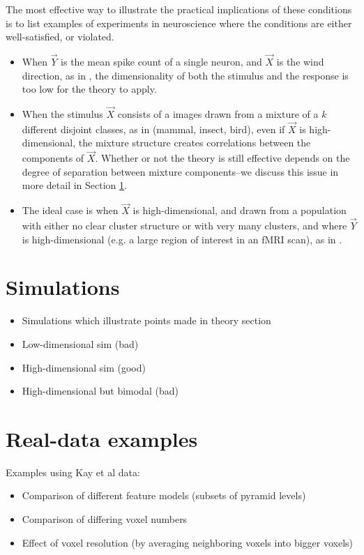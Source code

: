 \documentclass[12pt]{article}
\begin{document}
The most effective way to illustrate the practical implications of these conditions is to list examples of experiments in neuroscience where the conditions are either well-satisfied, or violated.
\begin{itemize}
\item When $\vec{Y}$ is the mean spike count of a single neuron, and $\vec{X}$ is the wind direction, as in \cite{Theunissen1991}, the dimensionality of both the stimulus and the response is too low for the theory to apply.
\item When the stimulus $\vec{X}$ consists of a images drawn from a mixture of a $k$ different disjoint classes, as in \cite{Connolly2012} (mammal, insect, bird), even if $\vec{X}$ is high-dimensional, the mixture structure creates correlations between the components of $\vec{X}$.  Whether or not the theory is still effective depends on the degree of separation between mixture components--we discuss this issue in more detail in Section \ref{sec:simulations}.
\item The ideal case is when $\vec{X}$ is high-dimensional, and drawn from a population with either no clear cluster structure or with very many clusters, and where $\vec{Y}$ is high-dimensional (e.g. a large region of interest in an fMRI scan), as in \cite{Kay2008a}\cite{Mitchell2008}.
\end{itemize}

\section{Simulations}\label{sec:simulations}

\begin{itemize}
\item Simulations which illustrate points made in theory section
\item Low-dimensional sim (bad)
\item High-dimensional sim (good)
\item High-dimensional but bimodal (bad)
\end{itemize}

\section{Real-data examples}

Examples using Kay et al data:
\begin{itemize}
\item Comparison of different feature models (subsets of pyramid levels)
\item Comparison of differing voxel numbers
\item Effect of voxel resolution (by averaging neighboring voxels into bigger voxels)
\end{itemize}

{}

\end{document}
